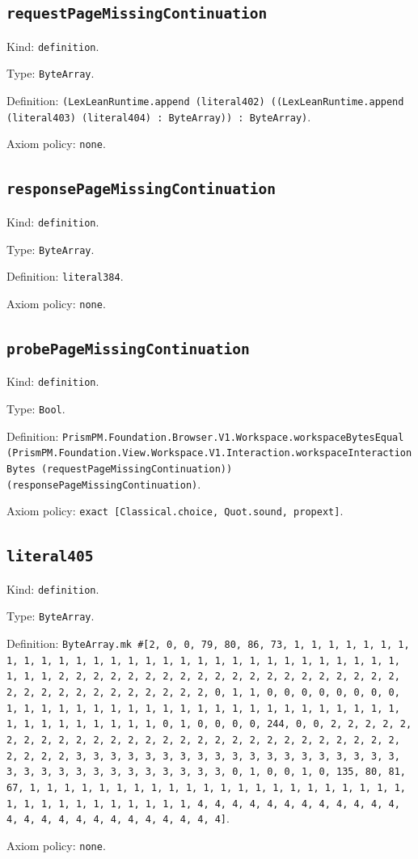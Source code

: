 \documentclass[11pt]{article}
\begin{document}
\subsection*{\texttt{requestPageMissingContinuation}}
\noindent Kind: \texttt{definition}.\par
\noindent Type: \texttt{ByteArray}.\par
\noindent Definition: \texttt{(LexLeanRuntime.append (literal402) ((LexLeanRuntime.append (literal403) (literal404) : ByteArray)) : ByteArray)}.\par
\noindent Axiom policy: \texttt{none}.\par
\subsection*{\texttt{responsePageMissingContinuation}}
\noindent Kind: \texttt{definition}.\par
\noindent Type: \texttt{ByteArray}.\par
\noindent Definition: \texttt{literal384}.\par
\noindent Axiom policy: \texttt{none}.\par
\subsection*{\texttt{probePageMissingContinuation}}
\noindent Kind: \texttt{definition}.\par
\noindent Type: \texttt{Bool}.\par
\noindent Definition: \texttt{PrismPM.Foundation.Browser.V1.Workspace.workspaceBytesEqual (PrismPM.Foundation.View.Workspace.V1.Interaction.workspaceInteractionBytes (requestPageMissingContinuation)) (responsePageMissingContinuation)}.\par
\noindent Axiom policy: \texttt{exact [Classical.choice, Quot.sound, propext]}.\par
\subsection*{\texttt{literal405}}
\noindent Kind: \texttt{definition}.\par
\noindent Type: \texttt{ByteArray}.\par
\noindent Definition: \texttt{ByteArray.mk \#[2, 0, 0, 79, 80, 86, 73, 1, 1, 1, 1, 1, 1, 1, 1, 1, 1, 1, 1, 1, 1, 1, 1, 1, 1, 1, 1, 1, 1, 1, 1, 1, 1, 1, 1, 1, 1, 1, 1, 1, 2, 2, 2, 2, 2, 2, 2, 2, 2, 2, 2, 2, 2, 2, 2, 2, 2, 2, 2, 2, 2, 2, 2, 2, 2, 2, 2, 2, 2, 2, 2, 2, 0, 1, 1, 0, 0, 0, 0, 0, 0, 0, 0, 1, 1, 1, 1, 1, 1, 1, 1, 1, 1, 1, 1, 1, 1, 1, 1, 1, 1, 1, 1, 1, 1, 1, 1, 1, 1, 1, 1, 1, 1, 1, 1, 0, 1, 0, 0, 0, 0, 244, 0, 0, 2, 2, 2, 2, 2, 2, 2, 2, 2, 2, 2, 2, 2, 2, 2, 2, 2, 2, 2, 2, 2, 2, 2, 2, 2, 2, 2, 2, 2, 2, 2, 2, 3, 3, 3, 3, 3, 3, 3, 3, 3, 3, 3, 3, 3, 3, 3, 3, 3, 3, 3, 3, 3, 3, 3, 3, 3, 3, 3, 3, 3, 3, 3, 3, 0, 1, 0, 0, 1, 0, 135, 80, 81, 67, 1, 1, 1, 1, 1, 1, 1, 1, 1, 1, 1, 1, 1, 1, 1, 1, 1, 1, 1, 1, 1, 1, 1, 1, 1, 1, 1, 1, 1, 1, 1, 1, 1, 4, 4, 4, 4, 4, 4, 4, 4, 4, 4, 4, 4, 4, 4, 4, 4, 4, 4, 4, 4, 4, 4, 4, 4, 4]}.\par
\noindent Axiom policy: \texttt{none}.\par
\end{document}
